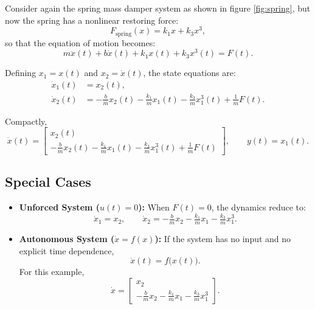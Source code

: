 \begin{example}
Consider again the spring mass damper system as shown in figure \ref{fig:spring}, but now the spring has a nonlinear restoring force:
\begin{equation}
    F_{\text{spring}}(x) = k_1 x + k_3 x^3,
\end{equation}
so that the equation of motion becomes:
\begin{equation}
    m\ddot{x}(t) + b\dot{x}(t) + k_1 x(t) + k_3 x^3(t) = F(t).
\end{equation}

Defining $x_1 = x(t)$ and $x_2 = \dot{x}(t)$, the state equations are:
\begin{align}
    \dot{x}_1(t) &= x_2(t), \\
    \dot{x}_2(t) &= -\tfrac{b}{m}x_2(t) - \tfrac{k_1}{m}x_1(t) - \tfrac{k_3}{m}x_1^3(t) + \tfrac{1}{m}F(t).
\end{align}

Compactly,
\begin{equation}
\dot{x}(t) =
\begin{bmatrix}
x_2(t) \\
-\tfrac{b}{m}x_2(t) - \tfrac{k_1}{m}x_1(t) - \tfrac{k_3}{m}x_1^3(t) + \tfrac{1}{m}F(t)
\end{bmatrix},
\qquad
y(t) = x_1(t).
\end{equation}
\end{example}

\subsection{Special Cases}
\begin{itemize}
    \item \textbf{Unforced System ($u(t)=0$):}  
    When $F(t)=0$, the dynamics reduce to:
    \begin{equation}
        \dot{x}_1 = x_2, \qquad 
        \dot{x}_2 = -\tfrac{b}{m}x_2 - \tfrac{k_1}{m}x_1 - \tfrac{k_3}{m}x_1^3.
    \end{equation}

    \item \textbf{Autonomous System ($\dot{x}=f(x)$):}  
    If the system has no input and no explicit time dependence,
    \begin{equation}
        \dot{x}(t) = f\big(x(t)\big).
    \end{equation}
    For this example,
    \begin{equation}
        \dot{x} =
        \begin{bmatrix}
        x_2 \\
        -\tfrac{b}{m}x_2 - \tfrac{k_1}{m}x_1 - \tfrac{k_3}{m}x_1^3
        \end{bmatrix}.
    \end{equation}
\end{itemize}

